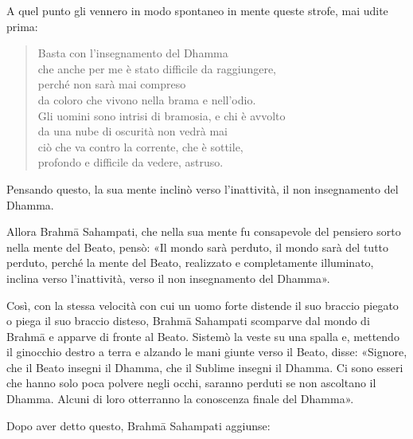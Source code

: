 A quel punto gli vennero in modo spontaneo in mente queste strofe, mai udite
prima:

\begin{quote}
Basta con l’insegnamento del Dhamma \\
che anche per me è stato difficile da raggiungere, \\
perché non sarà mai compreso \\
da coloro che vivono nella brama e nell’odio. \\
Gli uomini sono intrisi di bramosia, e chi è avvolto \\
da una nube di oscurità non vedrà mai \\
ciò che va contro la corrente, che è sottile, \\
profondo e difficile da vedere, astruso.
\end{quote}

Pensando questo, la sua mente inclinò verso l’inattività, il non insegnamento
del Dhamma.

Allora Brahmā Sahampati, che nella sua mente fu consapevole del pensiero sorto
nella mente del Beato, pensò: «Il mondo sarà perduto, il mondo sarà del tutto
perduto, perché la mente del Beato, realizzato e completamente illuminato,
inclina verso l’inattività, verso il non insegnamento del Dhamma».

Così, con la stessa velocità con cui un uomo forte distende il suo braccio
piegato o piega il suo braccio disteso, Brahmā Sahampati scomparve dal mondo di
Brahmā e apparve di fronte al Beato. Sistemò la veste su una spalla e, mettendo
il ginocchio destro a terra e alzando le mani giunte verso il Beato, disse:
«Signore, che il Beato insegni il Dhamma, che il Sublime insegni il Dhamma. Ci
sono esseri che hanno solo poca polvere negli occhi, saranno perduti se non
ascoltano il Dhamma. Alcuni di loro otterranno la conoscenza finale del Dhamma».

Dopo aver detto questo, Brahmā Sahampati aggiunse:

